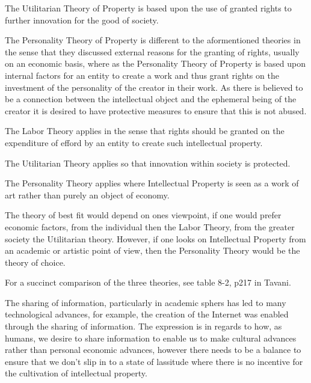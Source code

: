 The Utilitarian Theory of Property is based upon the use of granted rights to further innovation for the good of society.

The Personality Theory of Property is different to the aformentioned theories in the sense that they discussed external reasons for the granting of rights, usually on an economic basis, where as the Personality Theory of Property is based upon internal factors for an entity to create a work and thus grant rights on the investment of the personality of the creator in their work. As there is believed to be a connection between the intellectual object and the ephemeral being of the creator it is desired to have protective measures to ensure that this is not abused.



The Labor Theory applies in the sense that rights should be granted on the expenditure of efford by an entity to create such intellectual property.

The Utilitarian Theory applies so that innovation within society is protected.

The Personality Theory applies where Intellectual Property is seen as a work of art rather than purely an object of economy.

The theory of best fit would depend on ones viewpoint, if one would prefer economic factors, from the individual then the Labor Theory, from the greater society the Utilitarian theory. However, if one looks on Intellectual Property from an academic or artistic point of view, then the Personality Theory would be the theory of choice.

For a succinct comparison of the three theories, see table 8-2, p217 in Tavani.



The sharing of information, particularly in academic sphers has led to many technological advances, for example, the creation of the Internet was enabled through the sharing of information. The expression is in regards to how, as humans, we desire to share information to enable us to make cultural advances rather than personal economic advances, however there needs to be a balance to ensure that we don't slip in to a state of lassitude where there is no incentive for the cultivation of intellectual property.

